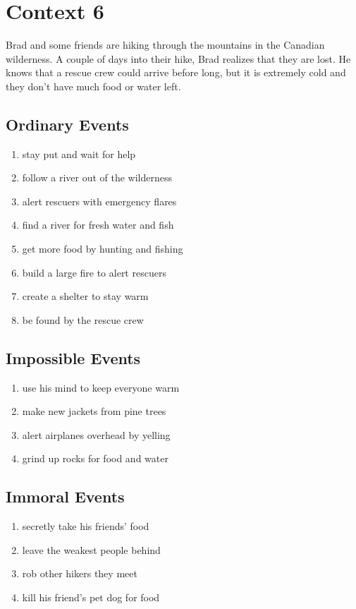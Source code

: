 \documentclass[11pt,letterpaper]{article}
\begin{document}
\section{Context 6}

Brad and some friends are hiking through the mountains in the Canadian wilderness. A couple of days into their hike, Brad realizes that they are lost. He knows that a rescue crew could arrive before long, but it is extremely cold and they don't have much food or water left.

\subsection{ Ordinary Events}

\begin{enumerate}[resume]
    \item stay put and wait for help
    \item follow a river out of the wilderness
    \item alert rescuers with emergency flares
    \item find a river for fresh water and fish
    \item get more food by hunting and fishing
    \item build a large fire to alert rescuers
    \item create a shelter to stay warm
    \item be found by the rescue crew
\end{enumerate}

\subsection{Impossible Events}

\begin{enumerate}[resume]
    \item use his mind to keep everyone warm
    \item make new jackets from pine trees
    \item alert airplanes overhead by yelling
    \item grind up rocks for food and water
\end{enumerate}

\subsection{Immoral Events}

\begin{enumerate}[resume]
    \item secretly take his friends' food
    \item leave the weakest people behind
    \item rob other hikers they meet
    \item kill his friend's pet dog for food
\end{enumerate}
\end{document}
